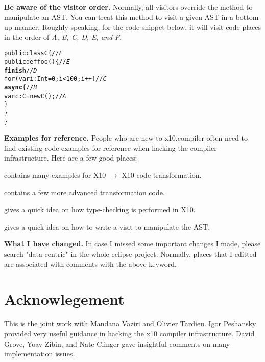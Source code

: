 \documentclass{article}
\begin{document}
\begin{enumerate}
\Item \textbf{Be aware of the visitor order.} Normally, all visitors override the  method to manipulate an AST. You can treat this method to visit a given AST in a bottom-up manner.  Roughly speaking, for the code snippet below, it will visit code places in the order of \textit{A, B, C,  D, E, and F}.

\begin{CodeOut}
\begin{alltt}
public class C \{                          //\textit{F}
    public def foo() \{                      //\textit{E}
        \textbf{finish}                                //\textit{D}
            for (var i:Int = 0; i < 100; i++)   //\textit{C}
                \textbf{async} \{                          //\textit{B}
                      var c:C = new C();           //\textit{A}
                \}
    \}
\}
\end{alltt}
\end{CodeOut}

\Item \textbf{Examples for reference.} People who are new to x10.compiler often need to find existing code examples for reference when hacking the compiler infrastructure. Here are a few good places:

\begin{itemize}

\Item {} contains many examples for X10 $\rightarrow$ X10 code transformation.

\Item {} contains a few more advanced transformation code.

\Item {} gives a quick idea on how type-checking is performed in X10.

\Item {} gives a quick idea on how to write a visit to manipulate the AST.

\end{itemize}

\Item \textbf{What I have changed.} In case I missed some important changes I made, please search "data-centric" in the whole eclipse project. Normally, places that I editted  are associated with comments with the above keyword.

\end{enumerate}


\section{Acknowlegement}

This is the joint work with Mandana Vaziri and Olivier Tardieu. Igor Peshansky provided very useful guidance in hacking the x10 compiler infrastructure. David Grove, Yoav Zibin, and Nate Clinger gave insightful comments on many implementation issues.
\end{document}
